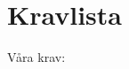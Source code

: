 \documentclass[a4paper,8pt]{article}
\begin{document}
\section{Kravlista}
%
%

Våra krav:

\vspace{0.2cm}
\end{document}
